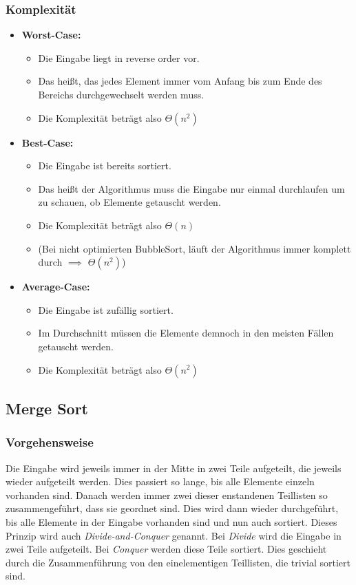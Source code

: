 \documentclass[
../../AuD-Zusammenfassung.tex,
]
{subfiles}
\begin{document}
\subsubsection{Komplexität}
\begin{itemize}
    \item \textbf{Worst-Case:}
    \begin{itemize}
        \item Die Eingabe liegt in reverse order vor. 
        \item Das heißt, das jedes Element immer vom Anfang bis zum Ende des Bereichs durchgewechselt werden muss.
        \item Die Komplexität beträgt also $\Theta(n^2)$
    \end{itemize}
    \item \textbf{Best-Case:}
    \begin{itemize}
        \item Die Eingabe ist bereits sortiert.
        \item Das heißt der Algorithmus muss die Eingabe nur einmal durchlaufen um zu schauen, ob Elemente getauscht werden.
        \item Die Komplexität beträgt also $\Theta(n)$
        \item (Bei nicht optimierten BubbleSort, läuft der Algorithmus immer komplett durch $\implies$ $\Theta(n^2)$)
    \end{itemize}
    \item \textbf{Average-Case:}
    \begin{itemize}
        \item Die Eingabe ist zufällig sortiert.
        \item Im Durchschnitt müssen die Elemente demnoch in den meisten Fällen getauscht werden.
        \item Die Komplexität beträgt also $\Theta(n^2)$
    \end{itemize}
\end{itemize}

\subsection{Merge Sort}

\subsubsection{Vorgehensweise}
Die Eingabe wird jeweils immer in der Mitte in zwei Teile aufgeteilt, die jeweils wieder aufgeteilt werden. Dies passiert so lange, bis alle Elemente einzeln vorhanden sind. Danach werden immer zwei dieser enstandenen Teillisten so zusammengeführt, dass sie geordnet sind. Dies wird dann wieder durchgeführt, bis alle Elemente in der Eingabe vorhanden sind und nun auch sortiert.
Dieses Prinzip wird auch \textit{Divide-and-Conquer} genannt. Bei \textit{Divide} wird die Eingabe in zwei Teile aufgeteilt. Bei \textit{Conquer} werden diese Teile sortiert. Dies geschieht durch die Zusammenführung von den einelementigen Teillisten, die trivial sortiert sind.
\newpage
\end{document}
